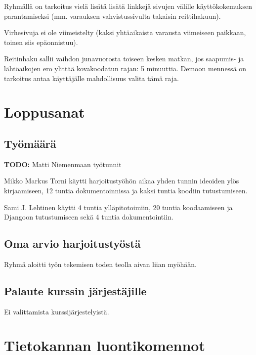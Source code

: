 \documentclass[a4paper,twoside,titlepage,12pt]{article}
\begin{document}
Ryhmällä on tarkoitus vielä lisätä lisätä linkkejä sivujen välille
käyttökokemuksen parantamiseksi (mm. varauksen vahvistussivulta takaisin
reittihakuun).

Virhesivuja ei ole viimeistelty (kaksi yhtäaikaista varausta viimeiseen
paikkaan, toinen siis epäonnistuu).

Reitinhaku sallii vaihdon junavuorosta toiseen kesken matkan, jos saapumis- ja
lähtöaikojen ero ylittää kovakoodatun rajan: 5 minuuttia. Demoon mennessä on
tarkoitus antaa käyttäjälle mahdollisuus valita tämä raja.

\section{Loppusanat}
\subsection{Työmäärä}
\textbf{TODO:} Matti Niemenmaan työtunnit

Mikko Markus Torni käytti harjoitustyöhön aikaa yhden tunnin ideoiden ylös kirjaamiseen, 12 tuntia dokumentoinnissa ja kaksi tuntia koodiin tutustumiseen.

Sami J. Lehtinen käytti 4 tuntia ylläpitotoimiin, 20 tuntia koodaamiseen
ja Djangoon tutustumiseen sekä 4 tuntia dokumentointiin.

\subsection{Oma arvio harjoitustyöstä}

Ryhmä aloitti työn tekemisen toden teolla aivan liian myöhään.

\subsection{Palaute kurssin järjestäjille}

Ei valittamista kurssijärjestelyistä.

%
%
% 
\newpage
\section*{Tietokannan luontikomennot}


\end{document}
